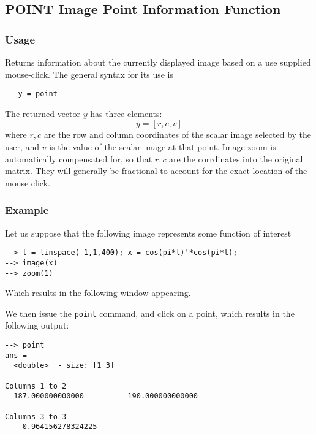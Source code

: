 %
%
%
\subsection{POINT Image Point Information Function}
\subsubsection{Usage}
Returns information about the currently displayed image based on a use
supplied mouse-click.  The general syntax for its use is
\begin{verbatim}
   y = point
\end{verbatim}
The returned vector $y$ has three elements: 
\[
  y= [r,c,v]
\]
where $r,c$ are the row and column coordinates of the scalar image selected
by the user, and $v$ is the value of the scalar image at that point.  Image
zoom is automatically compensated for, so that $r,c$ are the corrdinates into
the original matrix.  They will generally be fractional to account for the
exact location of the mouse click.
\subsubsection{Example}
Let us suppose that the following image represents some function of interest
\begin{verbatim}
--> t = linspace(-1,1,400); x = cos(pi*t)'*cos(pi*t);
--> image(x)
--> zoom(1)
\end{verbatim}
 Which results in the following window appearing.


We then issue the \verb|point| command, and click on a point, which results
in the following output:
\begin{verbatim}
--> point
ans = 
  <double>  - size: [1 3]
 
Columns 1 to 2
  187.000000000000          190.000000000000         
 
Columns 3 to 3
    0.964156278324225
\end{verbatim}
